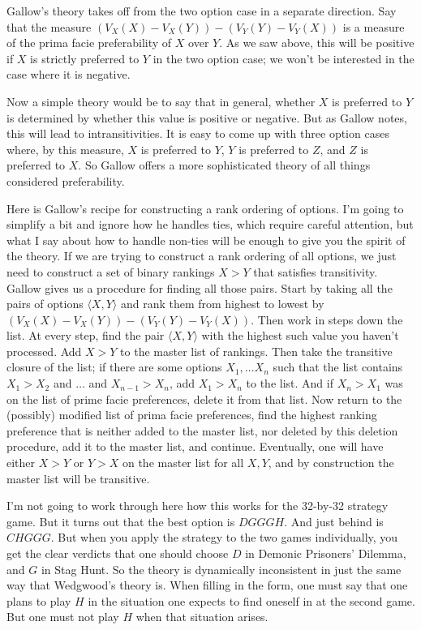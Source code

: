 \documentclass[
  12pt,
]{article}
\begin{document}
Gallow's theory takes off from the two option case in a separate
direction. Say that the measure
\((V_X(X) - V_X(Y)) - (V_Y(Y) - V_Y(X))\) is a measure of the prima
facie preferability of \(X\) over \(Y\). As we saw above, this will be
positive if \(X\) is strictly preferred to \(Y\) in the two option case;
we won't be interested in the case where it is negative.

Now a simple theory would be to say that in general, whether \(X\) is
preferred to \(Y\) is determined by whether this value is positive or
negative. But as Gallow notes, this will lead to intransitivities. It is
easy to come up with three option cases where, by this measure, \(X\) is
preferred to \(Y\), \(Y\) is preferred to \(Z\), and \(Z\) is preferred
to \(X\). So Gallow offers a more sophisticated theory of all things
considered preferability.

Here is Gallow's recipe for constructing a rank ordering of options. I'm
going to simplify a bit and ignore how he handles ties, which require
careful attention, but what I say about how to handle non-ties will be
enough to give you the spirit of the theory. If we are trying to
construct a rank ordering of all options, we just need to construct a
set of binary rankings \(X > Y\) that satisfies transitivity. Gallow
gives us a procedure for finding all those pairs. Start by taking all
the pairs of options \(\langle X, Y \rangle\) and rank them from highest
to lowest by \((V_X(X) - V_X(Y)) - (V_Y(Y) - V_Y(X))\). Then work in
steps down the list. At every step, find the pair
\(\langle X, Y \rangle\) with the highest such value you haven't
processed. Add \(X > Y\) to the master list of rankings. Then take the
transitive closure of the list; if there are some options
\(X_1, \dots X_n\) such that the list contains \(X_1 > X_2\) and
\(\dots\) and \(X_{n-1} > X_n\), add \(X_1 > X_n\) to the list. And if
\(X_n > X_1\) was on the list of prime facie preferences, delete it from
that list. Now return to the (possibly) modified list of prima facie
preferences, find the highest ranking preference that is neither added
to the master list, nor deleted by this deletion procedure, add it to
the master list, and continue. Eventually, one will have either
\(X > Y\) or \(Y > X\) on the master list for all \(X, Y\), and by
construction the master list will be transitive.

I'm not going to work through here how this works for the 32-by-32
strategy game. But it turns out that the best option is \(DGGGH\). And
just behind is \(CHGGG\). But when you apply the strategy to the two
games individually, you get the clear verdicts that one should choose
\(D\) in Demonic Prisoners' Dilemma, and \(G\) in Stag Hunt. So the
theory is dynamically inconsistent in just the same way that Wedgwood's
theory is. When filling in the form, one must say that one plans to play
\(H\) in the situation one expects to find oneself in at the second
game. But one must not play \(H\) when that situation arises.
\end{document}

